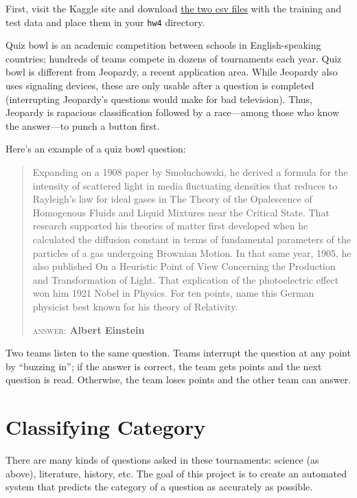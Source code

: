 \documentclass[11pt]{article}
\begin{document}
First, visit the Kaggle site and download \href{https://inclass.kaggle.com/c/digging-into-data-hw2-predict-2013-home-prices/data}{the two csv files} with the training and test data and place them in your \texttt{hw4} directory.

Quiz bowl is an academic competition between schools in English-speaking countries; hundreds of teams compete in dozens of tournaments each year. Quiz bowl is different from Jeopardy, a recent application area. While Jeopardy also uses signaling devices, these are only usable after a question is completed (interrupting Jeopardy's questions would make for bad television). Thus, Jeopardy is rapacious classification followed by a race---among those who know the answer---to punch a button first.

Here's an example of a quiz bowl question:

\begin{quote}
Expanding on a 1908 paper by Smoluchowski, he derived a formula for the intensity of scattered light in media fluctuating densities that reduces to Rayleigh's law for ideal gases in The Theory of the Opalescence of Homogenous Fluids and Liquid Mixtures near the Critical State. That research supported his theories of matter first developed when he calculated the diffusion constant in terms of fundamental parameters of the particles of a gas undergoing Brownian Motion. In that same year, 1905, he also published On a Heuristic Point of View Concerning the Production and Transformation of Light. That explication of the photoelectric effect won him 1921 Nobel in Physics. For ten points, name this German physicist best known for his theory of Relativity.

\textsc{answer}: {\bf Albert Einstein}
\end{quote}

Two teams listen to the same question. Teams interrupt the question at any point by ``buzzing in''; if the answer is correct, the team gets points and the next question is read. Otherwise, the team loses points and the other team can answer.

\section*{Classifying Category}

There are many kinds of questions asked in these tournaments: science (as above), literature, history, etc.  The goal of this project is to create an automated system that predicts the category of a question as accurately as possible.
\end{document}
